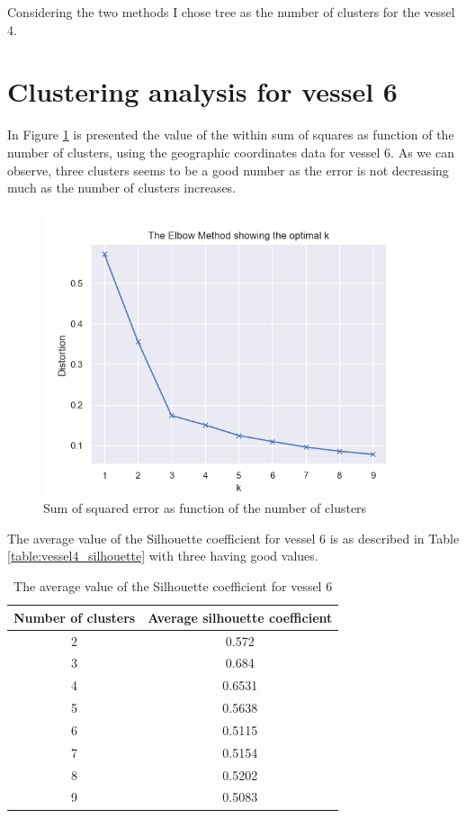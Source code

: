 Considering the two methods I chose tree as the number of clusters for the vessel 4.


\section{Clustering analysis for vessel 6} %
\label{sub:clustering_vessel_6}
In Figure \ref{fig:elbow_method_6} is presented the value of the within sum of squares as function of the number of clusters, using the geographic coordinates data for vessel 6. As we can observe, three clusters seems to be a good number as the error is not decreasing much as the number of clusters increases. 


\begin{figure}[]
\centering
\includegraphics[width=0.8\linewidth]{Chapters/img/elbow_method6.png}
\caption{Sum of squared error as function of the number of clusters}
\label{fig:elbow_method_6}
\end{figure}


The average value of the Silhouette coefficient for vessel 6 is as described in Table \ref{table:vessel4_silhouette} with three having good values.

\begin {table}[H]
\caption {The average value of the Silhouette coefficient for vessel 6}
\begin{center}
\begin{tabular}{c|c}
\textbf{Number of clusters} & \textbf{Average silhouette coefficient}  \\
\hline
2 & 0.572 \\
3 & 0.684 \\
4 & 0.6531 \\
5 & 0.5638 \\
6 & 0.5115 \\
7 & 0.5154 \\
8 & 0.5202 \\
9 & 0.5083 
\label{table:vessel6_silhouette}
\end{tabular}
\end{center}
\end {table}


